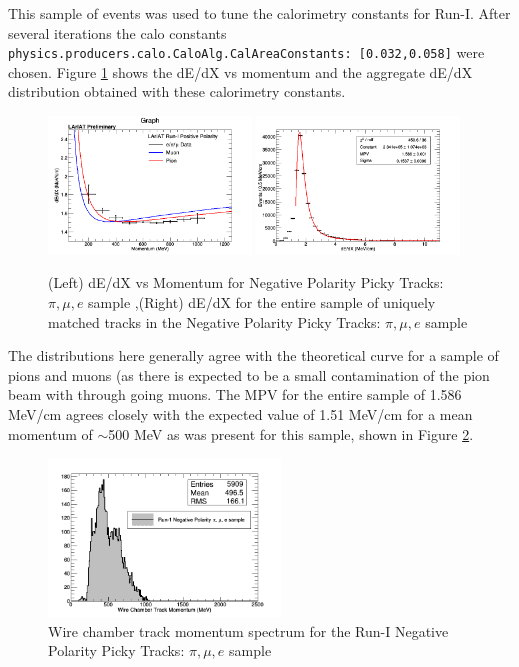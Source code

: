 This sample of events was used to tune the calorimetry constants for Run-I. After several iterations the calo constants \verb!physics.producers.calo.CaloAlg.CalAreaConstants: [0.032,0.058]! were chosen. Figure \ref{fig:Run1NegPickyTrkPiMuEResults} shows the dE/dX vs momentum and the aggregate dE/dX distribution obtained with these calorimetry constants.

\begin{figure}[htb]
\centering
\includegraphics[width=0.48\textwidth]{images/dEdXvsMomentumPosPolRun1FineBin.png}
\includegraphics[width=0.48\textwidth]{images/dEdXNegPolRun1.png}
\caption{(Left) dE/dX vs Momentum for Negative Polarity Picky Tracks: $\pi, \mu, e$ sample ,(Right) dE/dX for the entire sample of uniquely matched tracks in the Negative Polarity Picky Tracks: $\pi, \mu, e$ sample }
\label{fig:Run1NegPickyTrkPiMuEResults}
\end{figure}

The distributions here generally agree with the theoretical curve for a sample of pions and muons (as there is expected to be a small contamination of the pion beam with through going muons. The MPV for the entire sample of 1.586 MeV/cm agrees closely with the expected value of 1.51 MeV/cm for a mean momentum of $\sim$500 MeV as was present for this sample, shown in Figure \ref{fig:Run1NegPickyTrkPiMuEMomentumSpec}.

\begin{figure}[htb]
\centering
\includegraphics[width=0.55\textwidth]{images/WCTrkMomentumRun1NegPiMuE.png}
\caption{Wire chamber track momentum spectrum for the Run-I Negative Polarity Picky Tracks: $\pi, \mu, e$ sample  }
\label{fig:Run1NegPickyTrkPiMuEMomentumSpec}
\end{figure}

